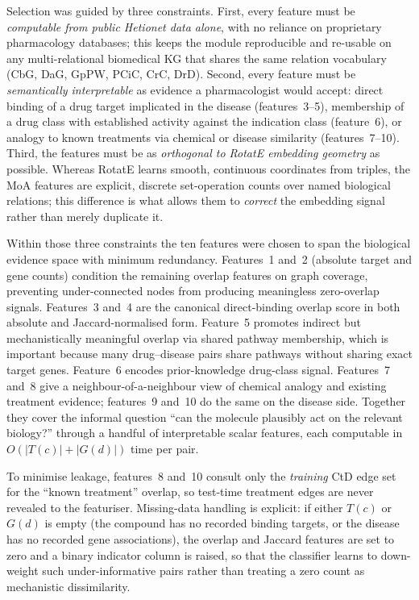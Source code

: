 \documentclass[twocolumn,10pt]{article}
\begin{document}
Selection was guided by three constraints. First, every feature must be \emph{computable from public Hetionet data alone}, with no reliance on proprietary pharmacology databases; this keeps the module reproducible and re-usable on any multi-relational biomedical KG that shares the same relation vocabulary (CbG, DaG, GpPW, PCiC, CrC, DrD). Second, every feature must be \emph{semantically interpretable} as evidence a pharmacologist would accept: direct binding of a drug target implicated in the disease (features~3--5), membership of a drug class with established activity against the indication class (feature~6), or analogy to known treatments via chemical or disease similarity (features~7--10). Third, the features must be as \emph{orthogonal to RotatE embedding geometry} as possible. Whereas RotatE learns smooth, continuous coordinates from triples, the MoA features are explicit, discrete set-operation counts over named biological relations; this difference is what allows them to \emph{correct} the embedding signal rather than merely duplicate it.

Within those three constraints the ten features were chosen to span the biological evidence space with minimum redundancy. Features~1 and~2 (absolute target and gene counts) condition the remaining overlap features on graph coverage, preventing under-connected nodes from producing meaningless zero-overlap signals. Features~3 and~4 are the canonical direct-binding overlap score in both absolute and Jaccard-normalised form. Feature~5 promotes indirect but mechanistically meaningful overlap via shared pathway membership, which is important because many drug--disease pairs share pathways without sharing exact target genes. Feature~6 encodes prior-knowledge drug-class signal. Features~7 and~8 give a neighbour-of-a-neighbour view of chemical analogy and existing treatment evidence; features~9 and~10 do the same on the disease side. Together they cover the informal question ``can the molecule plausibly act on the relevant biology?'' through a handful of interpretable scalar features, each computable in $O(|T(c)| + |G(d)|)$ time per pair.

To minimise leakage, features~8 and~10 consult only the \emph{training} CtD edge set for the ``known treatment'' overlap, so test-time treatment edges are never revealed to the featuriser. Missing-data handling is explicit: if either $T(c)$ or $G(d)$ is empty (the compound has no recorded binding targets, or the disease has no recorded gene associations), the overlap and Jaccard features are set to zero and a binary indicator column is raised, so that the classifier learns to down-weight such under-informative pairs rather than treating a zero count as mechanistic dissimilarity.
\end{document}
